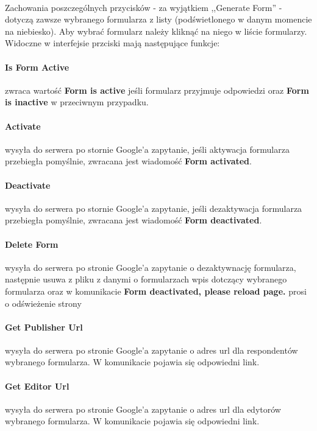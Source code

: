 \\Zachowania poszczególnych przycisków  - za wyjątkiem ,,Generate Form'' - dotyczą zawsze wybranego formularza z listy (podświetlonego w danym momencie na niebiesko). Aby wybrać formularz należy kliknąć na niego w liście formularzy. 
\\Widoczne w interfejsie przciski mają następujące funkcje:
\paragraph{Is Form Active} zwraca wartość \textbf{Form is active} jeśli formularz przyjmuje odpowiedzi oraz \textbf{Form is inactive} w przeciwnym przypadku.
\paragraph{Activate} wysyła do serwera po stornie Google'a zapytanie, jeśli aktywacja formularza przebiegła pomyślnie, zwracana jest wiadomość \textbf{Form activated}.
\paragraph{Deactivate} wysyła do serwera po stornie Google'a zapytanie, jeśli dezaktywacja formularza przebiegła pomyślnie, zwracana jest wiadomość \textbf{Form deactivated}.
\paragraph{Delete Form} wysyła do serwera po stronie Google'a zapytanie o dezaktywnację formularza, następnie usuwa z pliku z danymi o formularzach wpis dotczący wybranego formularza oraz w komunikacie \textbf{Form deactivated, please reload page.} prosi o odświeżenie strony
\paragraph{Get Publisher Url} wysyła do serwera po stronie Google'a zapytanie o adres url dla respondentów wybranego formularza. W komunikacie pojawia się odpowiedni link.
\paragraph{Get Editor Url} wysyła do serwera po stronie Google'a zapytanie o adres url dla edytorów wybranego formularza. W komunikacie pojawia się odpowiedni link.



